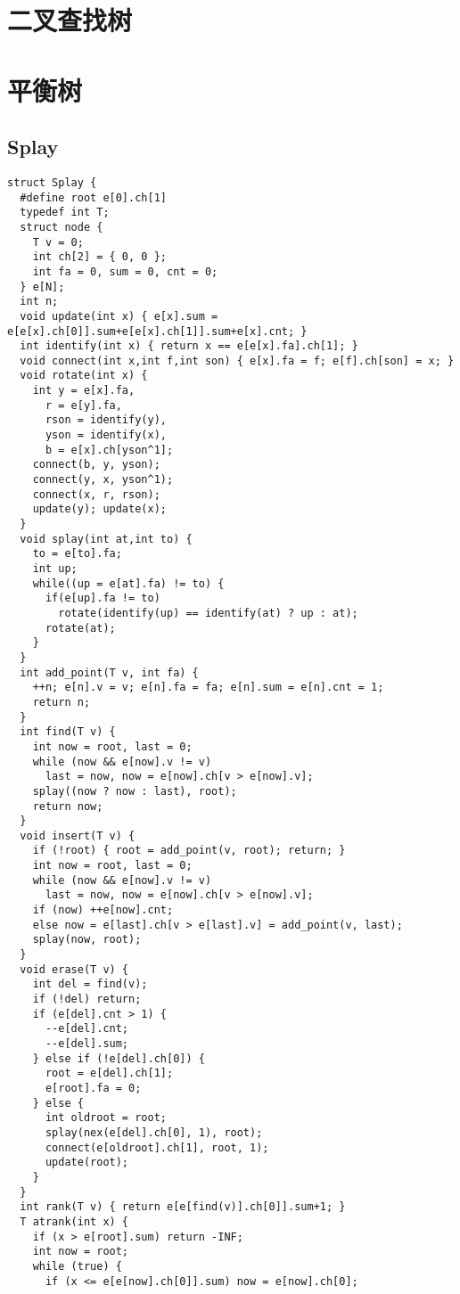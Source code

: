 \documentclass[UTF8]{ctexart}
\begin{document}
{{{{{{{{{{{{{{{{\section{二叉查找树}
\section{平衡树}
\subsection{Splay }
{\setmainfont{Consolas}
\begin{lstlisting}
struct Splay {
  #define root e[0].ch[1]
  typedef int T;
  struct node {
    T v = 0;
    int ch[2] = { 0, 0 };
    int fa = 0, sum = 0, cnt = 0;
  } e[N];
  int n;
  void update(int x) { e[x].sum = e[e[x].ch[0]].sum+e[e[x].ch[1]].sum+e[x].cnt; }
  int identify(int x) { return x == e[e[x].fa].ch[1]; }
  void connect(int x,int f,int son) { e[x].fa = f; e[f].ch[son] = x; }
  void rotate(int x) {
    int y = e[x].fa,
      r = e[y].fa,
      rson = identify(y),
      yson = identify(x),
      b = e[x].ch[yson^1];
    connect(b, y, yson);
    connect(y, x, yson^1);
    connect(x, r, rson);
    update(y); update(x);
  }
  void splay(int at,int to) {
    to = e[to].fa;
    int up;
    while((up = e[at].fa) != to) {
      if(e[up].fa != to)
        rotate(identify(up) == identify(at) ? up : at);
      rotate(at);
    }
  }
  int add_point(T v, int fa) {
    ++n; e[n].v = v; e[n].fa = fa; e[n].sum = e[n].cnt = 1;
    return n;
  }
  int find(T v) {
    int now = root, last = 0;
    while (now && e[now].v != v)
      last = now, now = e[now].ch[v > e[now].v];
    splay((now ? now : last), root);
    return now;
  }
  void insert(T v) {
    if (!root) { root = add_point(v, root); return; }
    int now = root, last = 0;
    while (now && e[now].v != v)
      last = now, now = e[now].ch[v > e[now].v];
    if (now) ++e[now].cnt;
    else now = e[last].ch[v > e[last].v] = add_point(v, last);
    splay(now, root);
  }
  void erase(T v) {
    int del = find(v);
    if (!del) return;
    if (e[del].cnt > 1) {
      --e[del].cnt;
      --e[del].sum;
    } else if (!e[del].ch[0]) {
      root = e[del].ch[1];
      e[root].fa = 0;
    } else {
      int oldroot = root;
      splay(nex(e[del].ch[0], 1), root);
      connect(e[oldroot].ch[1], root, 1);
      update(root);
    }
  }
  int rank(T v) { return e[e[find(v)].ch[0]].sum+1; }
  T atrank(int x) {
    if (x > e[root].sum) return -INF;
    int now = root;
    while (true) {
      if (x <= e[e[now].ch[0]].sum) now = e[now].ch[0];

\end{lstlisting}}}}}}}}}}}}}}}}}}
\end{document}
